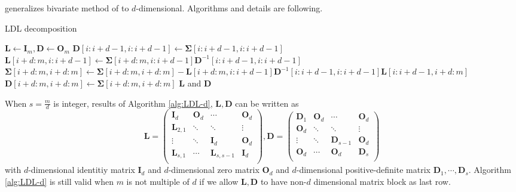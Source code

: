 \citet{cao2019hierarchical} generalizes bivariate method of \citet{trinh2015bivariate} to $d$-dimensional. Algorithms and details are following.
\begin{algorithm}[H]
	\caption{LDL decomposition}
	\begin{algorithmic}[1]
		\State $\mathbf{L} \leftarrow \mathbf{I}_m, \mathbf{D} \leftarrow \mathbf{O}_m$
		\State $\mathbf{D}[i:i+d-1,i:i+d-1] \leftarrow \boldsymbol{\Sigma}[i:i+d-1,i:i+d-1]$
		\State $\mathbf{L}[i+d:m,i:i+d-1] \leftarrow \boldsymbol{\Sigma}[i+d:m,i:i+d-1]\mathbf{D}^{-1}[i:i+d-1,i:i+d-1]$
		\State $\boldsymbol{\Sigma}[i+d:m,i+d:m]\leftarrow\boldsymbol{\Sigma}[i+d:m,i+d:m]-\mathbf{L}[i+d:m,i:i+d-1] \mathbf{D}^{-1}[i:i+d-1,i:i+d-1] \mathbf{L}[i:i+d-1,i+d:m]$
			\State $\mathbf{D}[i+d:m,i+d:m] \leftarrow \boldsymbol{\Sigma}[i+d:m,i+d:m]$
		\EndIf
		\EndFor
		\State\Return $\mathbf{L}$ and $\mathbf{D}$
		\EndProcedure
		
	\end{algorithmic}\label{alg:LDL-d}
\end{algorithm}
When $s=\frac{m}{d}$ is integer, results of Algorithm \ref{alg:LDL-d}, $\mathbf{L}, \mathbf{D}$ can be written as
$$
\mathbf{L} = \begin{pmatrix}
\mathbf{I}_d & \mathbf{O}_d & \cdots &\mathbf{O}_d\\
\mathbf{L}_{2,1} & \ddots & \ddots &\vdots\\
\vdots & \ddots & \mathbf{I}_d & \mathbf{O}_d\\
\mathbf{L}_{s,1} & \cdots & \mathbf{L}_{s,s-1} &\mathbf{I}_d\\
\end{pmatrix},
\mathbf{D} = \begin{pmatrix}
\mathbf{D}_1 & \mathbf{O}_d & \cdots &\mathbf{O}_d\\
\mathbf{O}_{d} & \ddots & \ddots &\vdots\\
\vdots & \ddots & \mathbf{D}_{s-1} & \mathbf{O}_d\\
\mathbf{O}_d & \cdots & \mathbf{O}_d &\mathbf{D}_s\\
\end{pmatrix}
$$
with $d$-dimensional identitiy matrix $\mathbf{I}_d$ and $d$-dimensional zero matrix $\mathbf{O}_d$ and $d$-dimensional positive-definite matrix $\mathbf{D}_1,\cdots,\mathbf{D}_s$. Algorithm \ref{alg:LDL-d} is still valid when $m$ is not multiple of $d$ if we allow $\mathbf{L},\mathbf{D}$ to have non-$d$ dimensional matrix block as last row.\\
